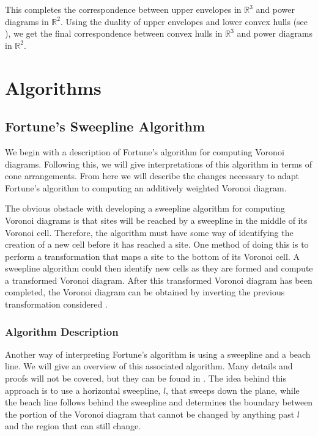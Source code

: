 \documentclass[a4paper, 11pt]{article}
\newcommand{\R}{\mathbb{R}}
\begin{document}
This completes the correspondence between upper envelopes in $\R^3$ and power diagrams in $\R^2$. Using the duality of upper envelopes and lower convex hulls (see
\cite{comp_geom}), we get the final correspondence between convex hulls in $\R^3$ and power diagrams in $\R^2$.

\section{Algorithms}

\subsection{Fortune's Sweepline Algorithm}

We begin with a description of Fortune's algorithm for computing Voronoi diagrams. Following this, we will give interpretations of this algorithm in
terms of cone arrangements. From here we will describe the changes necessary to adapt Fortune's algorithm to computing an additively weighted Voronoi
diagram.

The obvious obstacle with developing a sweepline algorithm for computing Voronoi diagrams is that sites will be reached by a sweepline in the middle
of its Voronoi cell. Therefore, the algorithm must have some way of identifying the creation of a new cell before it has reached a site. One method of
doing this is to perform a transformation that maps a site to the bottom of its Voronoi cell. A sweepline algorithm could then identify new cells as
they are formed and compute a transformed Voronoi diagram. After this transformed Voronoi diagram has been completed, the Voronoi diagram can be
obtained by inverting the previous transformation considered \cite{fortune_sweepline}.

\subsubsection{Algorithm Description}
Another way of interpreting Fortune's algorithm is using a sweepline and a beach line. We will give an overview of this associated algorithm. Many
details and proofs will not be covered, but they can be found in \cite{comp_geom}. The idea behind this approach is to use a
horizontal sweepline, $l$, that sweeps down the plane, while the beach line follows behind the sweepline and determines the boundary between the portion of the Voronoi diagram that cannot be
changed by anything past $l$ and the region that can still change.
\end{document}

